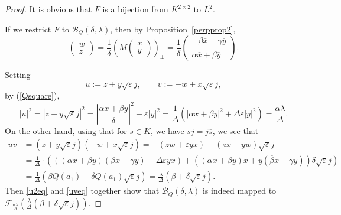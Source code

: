 \documentclass[11pt]{amsart}
\theoremstyle{definition}
\theoremstyle{remark}
\begin{document}
\begin{proof}
It is obvious that $F$ is a bijection from $K^{2\times 2}$ to $L^2$.

If we restrict $F$ to $\mathcal B_Q(\delta,\lambda)$, then by Proposition~\ref{perpprop2},
\[
\begin{pmatrix}
w \\ z
\end{pmatrix} = \frac{1}{\delta}\left(M\begin{pmatrix}
x \\ y
\end{pmatrix}\right)_{\perp} = \frac{1}{\delta} \begin{pmatrix}
-\beta \overline{x} - \gamma \overline{y}\\ \alpha \overline{x} + \overline{\beta} \overline{y}
\end{pmatrix}.
\]


Setting
\[
u:=\overline z+\overline y\sqrt{\varepsilon}j,\qquad v:=-w+\overline x\sqrt{\varepsilon}j,
\]
by (\ref{Qsquare}),
\begin{equation}\label{u2eq}
|u|^2=|\overline z+\overline y\sqrt{\varepsilon}j|^2=\left|\frac{\alpha x+\beta y}{\overline\delta}\right|^2+\varepsilon |\overline y|^2=\frac1\Delta\left(|\alpha x+\beta y|^2+\Delta\varepsilon|y|^2\right)=\frac{\alpha\lambda}{\Delta}.
\end{equation}
On the other hand, using that for $s\in K$, we have $sj=j\overline s$, we see that
\begin{equation}\label{uveq}
\begin{split}
uv&=(\overline z+\overline y\sqrt{\varepsilon}j)(-w+\overline x\sqrt{\varepsilon}j)=-(\overline zw+\varepsilon\overline yx)+\overline{(zx-yw)}\sqrt{\varepsilon}j\\ 
&=\frac1\Delta\cdot\left(((\alpha x+\beta y)(\beta\overline x+\gamma\overline y)-\Delta\varepsilon\overline y x)+((\alpha x+\beta y)\overline x+\overline y(\overline \beta x+\gamma y))\delta\sqrt{\varepsilon}j\right) \\ 
&=\frac1\Delta(\beta Q(a_1) +\delta Q(a_1)\sqrt{\varepsilon}j)=\frac\lambda\Delta(\beta+\delta\sqrt{\varepsilon}j).
\end{split}
\end{equation}
Then \eqref{u2eq} and \eqref{uveq} together show that $\mathcal B_Q(\delta,\lambda)$ is indeed mapped to $\mathcal F_{\frac{\alpha\lambda}{\Delta}}\left(\frac{\lambda}{\Delta}(\beta+\delta\sqrt{\varepsilon}j)\right)$.


\end{proof}
\end{document}
